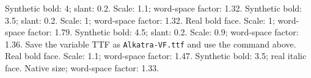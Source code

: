 \documentclass[11pt,a4paper]{article}
\begin{document}
  {Synthetic bold: 4; slant: 0.2. Scale: 1.1; word-space factor: 1.32.}
  {Synthetic bold: 3.5; slant: 0.2. Scale: 1; word-space factor: 1.32.}
  {Real bold face. Scale: 1; word-space factor: 1.79.}
  {Synthetic bold: 4.5; slant: 0.2. Scale: 0.9; word-space factor: 1.36.\newline
   Save the variable TTF as \texttt{Alkatra-VF.ttf} and use the command above.}
\ifdefined\shonarbanglafont
{}
  {Real bold face. Scale: 1.1; word-space factor: 1.47.}
\fi
{}
  {Synthetic bold: 3.5; real italic face. Native size; word-space factor: 1.33.}
\end{document}
